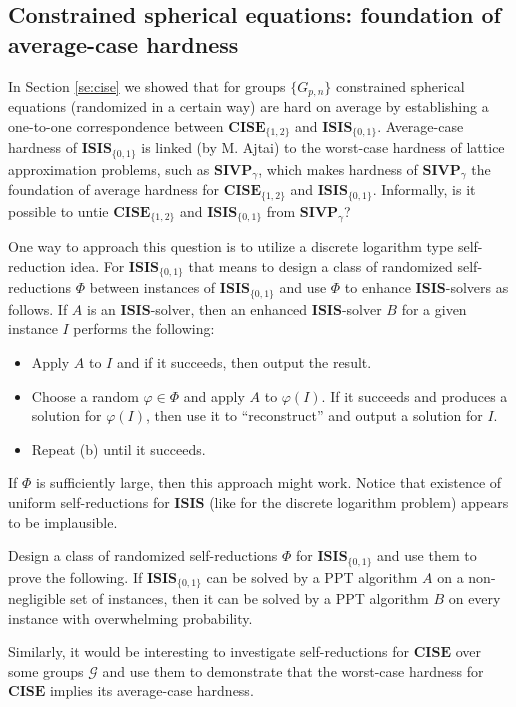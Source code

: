 \documentclass{jgcc}
\def\CG{{\mathcal G}}
\def\ISIS{{\mathbf{ISIS}}}
\def\SIVP{{\mathbf{SIVP}}}
\def\CISE{{\mathbf{CISE}}}
\begin{document}
\subsection{Constrained spherical equations: foundation of average-case hardness}
\label{se:CSE-foundations}

In Section \ref{se:cise} we showed that for  groups $\{G_{p,n}\}$ 
constrained spherical equations (randomized in a certain way)
are hard on average by establishing a one-to-one correspondence
between $\CISE_{\{1,2\}}$ and $\ISIS_{\{0,1\}}$.
Average-case hardness of $\ISIS_{\{0,1\}}$ is linked 
(by M. Ajtai) to the worst-case hardness 
of lattice approximation problems, such as $\SIVP_\gamma$,
which makes hardness of $\SIVP_\gamma$ the foundation of average hardness
for $\CISE_{\{1,2\}}$ and $\ISIS_{\{0,1\}}$.
Informally, is it possible to untie $\CISE_{\{1,2\}}$ and $\ISIS_{\{0,1\}}$ 
from $\SIVP_\gamma$?


One way to approach this question is to utilize
a discrete logarithm type self-reduction idea.
For $\ISIS_{\{0,1\}}$ that means to 
design a class of randomized self-reductions $\Phi$ between instances of
$\ISIS_{\{0,1\}}$ and use $\Phi$ to enhance $\ISIS$-solvers as follows.
If $A$ is an $\ISIS$-solver, then an enhanced $\ISIS$-solver $B$
for a given instance $I$  performs the following:
\begin{itemize}
\item[(a)]
Apply $A$ to $I$ and if it succeeds, then output the result.
\item[(b)]
Choose a random $\varphi\in\Phi$
and apply $A$ to $\varphi(I)$. If it succeeds and
produces a solution for $\varphi(I)$, then use it to ``reconstruct''
and output a solution for $I$.
\item[(c)]
Repeat (b) until it succeeds.
\end{itemize}
If $\Phi$ is sufficiently large, then this approach might work.
Notice that existence of uniform self-reductions for $\ISIS$
(like for the discrete logarithm problem)
appears to be implausible.

\begin{prob}\label{pr:pr4}
Design a class of randomized self-reductions $\Phi$ for $\ISIS_{\{0,1\}}$ and use them
to prove the following.
If $\ISIS_{\{0,1\}}$ can be solved by a PPT algorithm $A$ on a 
non-negligible set of instances, then it can be solved by a PPT algorithm 
$B$ on every instance with overwhelming probability.
\end{prob}


Similarly, it would be interesting to investigate self-reductions for $\CISE$
over some groups $\CG$
and use them to demonstrate that the worst-case hardness for $\CISE$
implies its average-case hardness.
\end{document}
